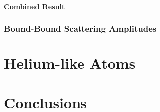 \documentclass[a4paper,titlepage]{report}
\begin{document}
	\subsubsection{Combined Result}

	\subsection{Bound-Bound Scattering Amplitudes}

\chapter{Helium-like Atoms}

\chapter{Conclusions}
\end{document}
